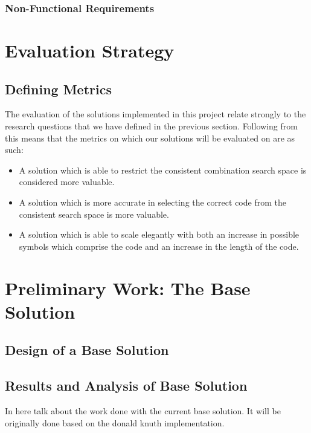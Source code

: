 \documentclass[11pt]{article}  %
\theoremstyle{definition}
\theoremstyle{remark}
\begin{document}
\subsubsection {Non-Functional Requirements}

\newpage                     %
\section{Evaluation Strategy}\label{ss:back}

\subsection {Defining Metrics}

The evaluation of the solutions implemented in this project relate strongly to the research questions that we have defined in the previous section. Following from this means that the metrics on which our solutions will be evaluated on are as such:
\begin {itemize}
	\item {A solution which is able to restrict the consistent combination search space is considered more valuable.}
	\item {A solution which is more accurate in selecting the correct code from the consistent search space is more valuable.}
	\item {A solution which is able to scale elegantly with both an increase in possible symbols which comprise the code and an increase in the length of the code.}
\end{itemize}

\newpage
\section {Preliminary Work: The Base Solution}

\subsection {Design of a Base Solution}

\subsection {Results and Analysis of Base Solution}
In here talk about the work done with the current base solution. It will be originally done based on the donald knuth implementation.


\newpage                     %
\end{document}
